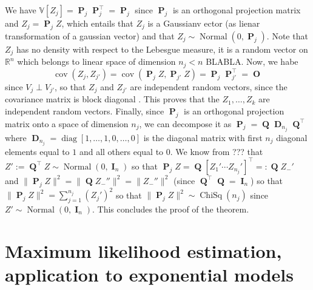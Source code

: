\documentclass[
	fontsize=11pt, %
	twoside=false, %
	numbers=noenddot, %
]{kaobook}
\DeclareMathOperator{\bD}{{\boldsymbol D}}
\DeclareMathOperator{\bI}{{\boldsymbol I}}
\DeclareMathOperator{\bO}{{\boldsymbol O}}
\DeclareMathOperator{\bP}{{\boldsymbol P}}
\DeclareMathOperator{\bQ}{{\boldsymbol Q}}
\DeclareMathOperator{\diag}{diag}
\DeclareMathOperator{\chisq}{ChiSq}
\DeclareMathOperator{\nor}{Normal}
\DeclareMathOperator{\cov}{cov}
\newcommand{\R}{\mathbb R}
\newcommand{\var}{\mathbb V}
\newcommand{\norm}[1]{\| #1 \|}
\begin{document}
We have $\var[Z_j] = \bP_j \bP_j^\top = \bP_j$ since $\bP_j$ is an orthogonal projection matrix and $Z_j = \bP_j Z$, which entails that $Z_j$ is a Gaussianv ector (as lienar transformation of a gaussian vector) and that $Z_j \sim \nor(0, \bP_j)$. Note that $Z_j$ has no density with respect to the Lebesgue measure, it is a random vector on $\R^n$ which belongs to linear space of dimension $n_j < n$ BLABLA. Now, we habe
\begin{equation*}
	\cov(Z_j, Z_{j'}) = \cov(\bP_j Z, \bP_{j'} Z) = \bP_j \bP_{j'}^\top = \bO
\end{equation*}
since $V_j \perp V_{j'}$, so that $Z_j$ and $Z_{j'}$ are independent random vectors, since the covariance matrix is block diagonal .
This proves that the $Z_1, \ldots, Z_k$ are independent random vectors.
Finally, since $\bP_j$ is an orthogonal projection matrix onto a space of dimension $n_j$, we can decompose  it as $\bP_j = \bQ \bD_{n_j} \bQ^\top$ where $\bD_{n_j} = \diag[1, \ldots, 1, 0, \ldots, 0]$ is the diagonal matrix with first $n_j$ diagonal elements equal to $1$ and all others equal to $0$.
We know from ??? that $Z' := \bQ^\top Z \sim \nor(0, \bI_n)$ so that $\bP_j Z = \bQ [Z_1' \cdots Z_{n_j}']^\top =: \bQ Z_-'$ and $\norm{\bP_j Z}^2 = \norm{\bQ Z_-''}^2 = \norm{Z_-''}^2$ (since $\bQ^\top \bQ = \bI_n$) so that $\norm{\bP_j Z}^2 = \sum_{j=1}^{n_j} (Z_j')^2$ so that $\norm{\bP_j Z}^2 \sim \chisq(n_j)$ since $Z' \sim \nor(0, \bI_n)$. This concludes the proof of the theorem.






\setchapterpreamble[u]{\margintoc}
\chapter{Maximum likelihood estimation, application to exponential models}
\label{chap:maximum_likelihood_estimation}




\printbibliography[heading=bibintoc, title=Bibliography] %
\end{document}
